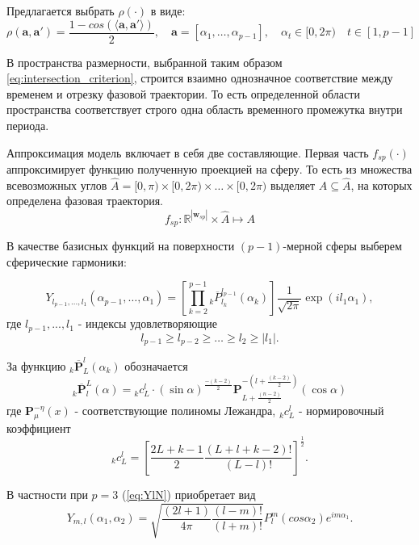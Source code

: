 \documentclass[12pt,twoside]{article}
\begin{document}
Предлагается выбрать $\rho(\cdot)$ в виде:
\[
    \rho(\mathbf{a},\mathbf{a}') = \frac{1 - cos(\langle \mathbf{a},\mathbf{a}' \rangle)}{2},
    \quad
	\mathbf{a} = [\alpha_{1},\dots, \alpha_{p-1}],
	\quad
	\alpha_t \in [0,2\pi)
	\quad
	t \in [1,p-1]
\]

В пространства размерности, выбранной таким образом \ref{eq:intersection_criterion}, строится взаимно однозначное соответствие между временем и отрезку фазовой траектории.
То есть определенной области пространства соответствует строго одна область временного промежутка внутри периода. 

Аппроксимация модель включает в себя две составляющие.
Первая  часть $f_{sp}(\cdot)$ аппроксимирует функцию полученную проекцией на сферу.
То есть из множества всевозможных углов $\hat{A} = [0,\pi)\times[0,2\pi)\times \dots \times [0,2\pi)$ выделяет $A \subseteq \hat{A}$, на которых определена фазовая траектория.
\begin{equation}
    f_{sp}: \mathbb{R}^{|\mathbf{{w}}_{sp}|} \times \hat{A}
    \mapsto
    A
\label{eq:f_sp}
\end{equation}

В качестве базисных функций на поверхности $(p-1)$-мерной сферы выберем сферические гармоники:

\begin{equation}
	Y_{l_{p-1},...,l_1}(\alpha_{p-1},\dots,\alpha_1) = 
	\left[
	    \prod\limits_{k = 2}^{p-1}
	    {_k}{\overline{P}}_{l_k}^{l_{p-1}}(\alpha_k)
	\right]
	    \frac{1}{\sqrt{2\pi}}
	    \exp{(i l_1 \alpha_1)},
\label{eq:YlN}
\end{equation}
где $l_{p-1},...,l_1$ - индексы удовлетворяющие
\[l_{p-1} \geq l_{p-2} \geq \dots \geq l_2 \geq|l_1|.\]

За функцию $_k\mathbf{\overline{P}}_{L}^{l}(\alpha_k)$ обозначается  
\[
   _k\mathbf{\overline{P}}_{l}^{L}(\alpha) =
   {_k}c^l_L \cdot (\sin \alpha)^{\frac{-(k-2)}{2}}
   \mathbf{P}^{-(l+\frac{(k-2)}{2})}_{L+\frac{(n-2)}{2}}(\cos \alpha)
\]
где $\mathbf{P}_{\mu}^{-\eta}(x)$ - соответствующие полиномы Лежандра, ${_k}c^l_L$ - нормировочный коэффициент
\[
    {_k}c^l_L = 
        \left[
	        \frac{2L+k-1}{2}
	        \frac{(L+l+k-2)!}{(L-l)!}
	    \right]^{\frac{1}{2}}.
\]

В частности при $p = 3$ (\ref{eq:YlN}) приобретает вид
\begin{equation}
	Y_{m,l}(\alpha_1,\alpha_2) = \sqrt{ \frac{(2l+1)}{4\pi} \frac{(l-m)!}{(l+m)!} } P_l^m(cos\alpha_2)e^{im\alpha_1}.
\label{eq:Yml}
\end{equation}
\end{document}
